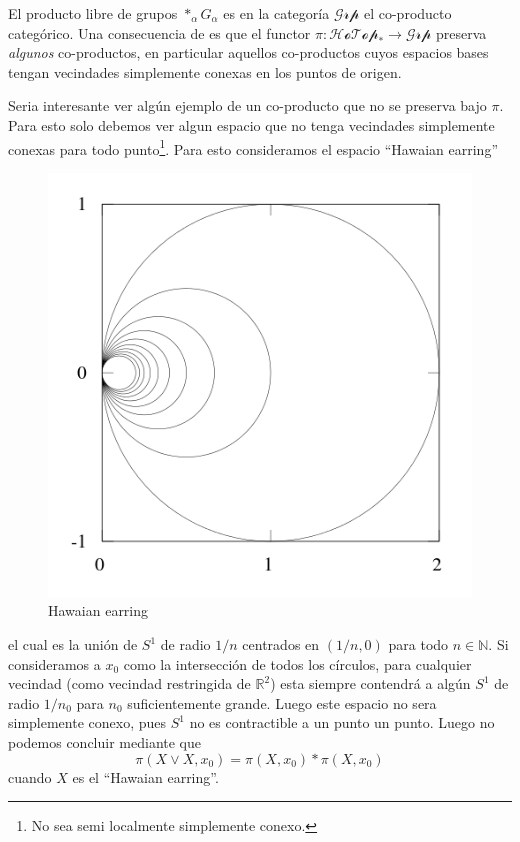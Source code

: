 El producto libre de grupos \(*_\alpha G_\alpha\) es en la categoría
\(\mathcal{Grp}\) el co-producto categórico. Una consecuencia
de \vank es que el functor \(\pi : \mathscr{HoTop}_* \to \mathscr{Grp}\)
preserva \emph{algunos} co-productos, en particular aquellos
co-productos cuyos espacios bases tengan vecindades simplemente conexas
en los puntos de origen.

Seria interesante ver algún ejemplo de un co-producto que no se preserva
bajo \(\pi\). Para esto solo debemos ver algun espacio que no tenga
vecindades simplemente conexas para todo punto\footnote{No sea semi localmente
simplemente conexo.}. Para esto consideramos el espacio ``Hawaian earring''
\begin{figure}[h]
  \centering
  \includegraphics[scale=0.3]{./imagenes/480px-Hawaiian_Earrings.svg.png}
  \caption*{Hawaian earring}
\end{figure}
el cual es la unión de \(S^1\) de radio \(1 / n\) centrados en
\((1/n, 0)\) para todo \(n \in \mathbb N\). Si consideramos a \(x_0\)
como la intersección de todos los círculos, para cualquier vecindad
(como vecindad restringida de \(\mathbb R ^2\)) esta siempre contendrá a
algún \(S^1\) de radio \(1 / {n_0}\) para \(n_0\) suficientemente
grande. Luego este espacio no sera simplemente conexo, pues \(S^1\) no
es contractible a un punto un punto. Luego no podemos concluir mediante
\vank que
\[ \pi (X \vee X , x_0) = \pi (X, x_0) * \pi (X, x_0)\]
cuando \(X\) es el ``Hawaian earring''.

